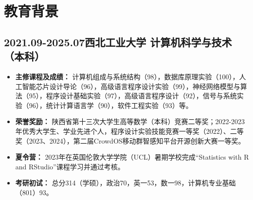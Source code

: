 \documentclass[11pt]{article}
\begin{document}
    \vspace{-2.5em} 
    
    \section{\makebox[\widthof{\faGraduationCap}][c]{\color{NPU_Blue}{\faGraduationCap}}\quad 教育背景}
        \subsection{2021.09-2025.07\hfill 西北工业大学 \hfill 计算机科学与技术（本科）}
        \vspace{-0.2em}
    
        \begin{itemize}
        \setlength{\itemsep}{0pt}  %
        \setlength{\parsep}{0pt}   %
        \setlength{\parskip}{0pt}  %
        \item\textbf{主修课程及成绩：} 计算机组成与系统结构（98），数据库原理实验（100），人工智能芯片设计导论（96），高级语言程序设计实验（99），神经网络模型与算法（95），程序设计基础实验（97），高级语言程序设计（92），信号与系统实验（96），统计计算语言学（90），软件工程实验（93）等。
        \item\textbf{荣誉奖励：} 陕西省第十三次大学生高等数学（本科）竞赛二等奖；2022-2023年优秀大学生、学业先进个人，程序设计实验技能竞赛一等奖（2022）、二等奖（2023、2024），第二届CrowdOS移动群智感知平台开源创新大赛一等奖。
        \item\textbf{夏令营：} 2023年在英国伦敦大学学院（UCL）暑期学校完成“Statistics with R and RStudio”课程学习并通过考核。
        \item\textbf{考研初试：} 总分314（学硕），政治70，英一53，数一98，计算机专业基础（801）93。
        \end{itemize}
    
    \vspace{-1.3em} 
    
\end{document}
